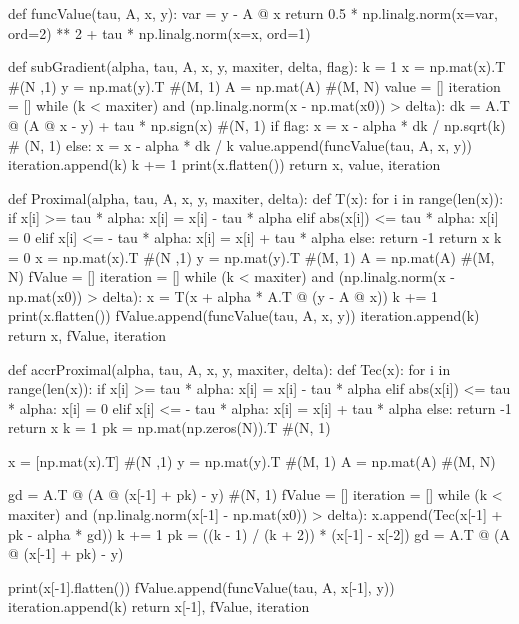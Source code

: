 \documentclass[12pt, a4 paper]{article}
\begin{document}
\begin{framed}
\begin{python}
def funcValue(tau, A, x, y):
    var = y - A @ x
    return 0.5 * np.linalg.norm(x=var, ord=2) ** 2 + tau * np.linalg.norm(x=x, ord=1)

def subGradient(alpha, tau, A, x, y, maxiter, delta, flag):
    k = 1
    x = np.mat(x).T #(N ,1)
    y = np.mat(y).T #(M, 1)
    A = np.mat(A) #(M, N)
    value = []
    iteration = []
    while (k < maxiter) and (np.linalg.norm(x - np.mat(x0)) > delta):
        dk = A.T @ (A @ x - y) + tau * np.sign(x) #(N, 1)
        if flag:
            x = x - alpha * dk / np.sqrt(k) # (N, 1)
        else:
            x = x - alpha * dk / k
        value.append(funcValue(tau, A, x, y))
        iteration.append(k)
        k += 1
        print(x.flatten())
    return x, value, iteration

def Proximal(alpha, tau, A, x, y, maxiter, delta):
    def T(x):
        for i in range(len(x)):
            if x[i] >= tau * alpha:
                x[i] = x[i] - tau * alpha
            elif abs(x[i]) <= tau * alpha:
                x[i] = 0
            elif x[i] <= - tau * alpha:
                x[i] = x[i] + tau * alpha
            else:
                return -1
        return x
    k = 0
    x = np.mat(x).T #(N ,1)
    y = np.mat(y).T #(M, 1)
    A = np.mat(A) #(M, N)
    fValue = []
    iteration = []
    while (k < maxiter) and (np.linalg.norm(x - np.mat(x0)) > delta):
        x = T(x + alpha * A.T @ (y - A @ x))
        k += 1
        print(x.flatten())
        fValue.append(funcValue(tau, A, x, y))
        iteration.append(k)
    return x, fValue, iteration


def accrProximal(alpha, tau, A, x, y, maxiter, delta):
    def Tec(x):
        for i in range(len(x)):
            if x[i] >= tau * alpha:
                x[i] = x[i] - tau * alpha
            elif abs(x[i]) <= tau * alpha:
                x[i] = 0
            elif x[i] <= - tau * alpha:
                x[i] = x[i] + tau * alpha
            else:
                return -1
        return x
    k = 1
    pk = np.mat(np.zeros(N)).T #(N, 1)

    x = [np.mat(x).T] #(N ,1)
    y = np.mat(y).T #(M, 1)
    A = np.mat(A) #(M, N)

    gd = A.T @ (A @ (x[-1] + pk) - y) #(N, 1)
    fValue = []
    iteration = []
    while (k < maxiter) and (np.linalg.norm(x[-1] - np.mat(x0)) > delta):
        x.append(Tec(x[-1] + pk - alpha * gd))
        k += 1
        pk = ((k - 1) / (k + 2)) * (x[-1] - x[-2])
        gd = A.T @ (A @ (x[-1] + pk) - y)

        print(x[-1].flatten())
        fValue.append(funcValue(tau, A, x[-1], y))
        iteration.append(k)
    return x[-1], fValue, iteration


\end{python}
\end{framed}
\end{document}
